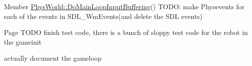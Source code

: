 \label{todo__todo000005}
\hypertarget{todo__todo000005}{}
 
\begin{DoxyDescription}
\item[Member \hyperlink{classPhysWorld_a81b3f0dcc0a90d039623f696343e6e9c}{PhysWorld::DoMainLoopInputBuffering}() ]TODO: make Physevents for each of the events in SDL\_\-WmEvents(and delete the SDL events) 
\end{DoxyDescription}

\label{todo__todo000003}
\hypertarget{todo__todo000003}{}
 
\begin{DoxyDescription}
\item[Page \hyperlink{MainLoop}{} ]TODO finish test code, there is a bunch of sloppy test code for the robot in the gameinit 

actually document the gameloop 
\end{DoxyDescription}